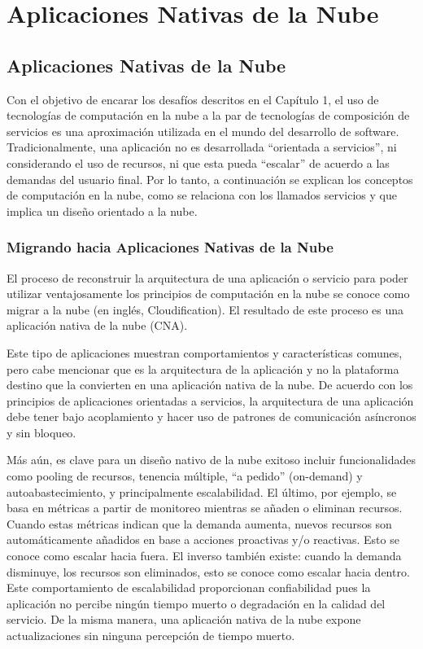\chapter{Aplicaciones Nativas de la Nube}

\section{Aplicaciones Nativas de la Nube}

    Con el objetivo de encarar los desafíos descritos en el Capítulo 1, el
    uso de tecnologías de computación en la nube a la par de tecnologías de
    composición de servicios es una aproximación utilizada en el mundo del
    desarrollo de software. Tradicionalmente, una aplicación no es
    desarrollada ``orientada a servicios'', ni considerando el uso de
    recursos, ni que esta pueda ``escalar'' de acuerdo a las demandas del
    usuario final. Por lo tanto, a continuación se explican los conceptos de
    computación en la nube, como se relaciona con los llamados servicios y
    que implica un diseño orientado a la nube.

    
	\subsection{Migrando hacia Aplicaciones Nativas de la Nube}
	
    El proceso de reconstruir la arquitectura de una aplicación o servicio para poder utilizar ventajosamente los principios de computación en la nube se conoce como migrar a la nube (en inglés, Cloudification). El resultado de este proceso es una aplicación nativa de la nube (CNA). 
    
    Este tipo de aplicaciones muestran comportamientos y características comunes, pero cabe mencionar que es la arquitectura de la aplicación y no la plataforma destino que la convierten en una aplicación nativa de la nube. De acuerdo con los principios de aplicaciones orientadas a servicios, la arquitectura de una aplicación debe tener bajo acoplamiento y hacer uso de patrones de comunicación asíncronos y sin bloqueo. 
    
    Más aún, es clave para un diseño nativo de la nube exitoso incluir funcionalidades como pooling de recursos, tenencia múltiple, “a pedido” (on-demand) y autoabastecimiento, y principalmente escalabilidad. El último, por ejemplo, se basa en métricas a partir de monitoreo mientras se añaden o eliminan recursos. Cuando estas métricas indican que la demanda aumenta, nuevos recursos son automáticamente añadidos en base a acciones proactivas y/o reactivas. Esto se conoce como escalar hacia fuera. El inverso también existe: cuando la demanda disminuye, los recursos son eliminados, esto se conoce como escalar hacia dentro. Este comportamiento de escalabilidad proporcionan confiabilidad pues la aplicación no percibe ningún tiempo muerto o degradación en la calidad del servicio. De la misma manera, una aplicación nativa de la nube expone actualizaciones sin ninguna percepción de tiempo muerto. 
    
